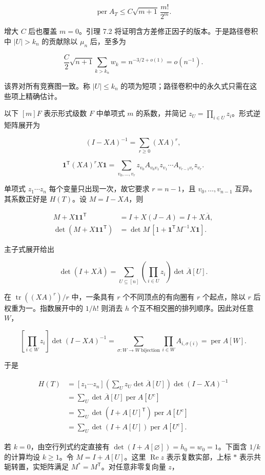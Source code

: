\documentclass[11pt,a4paper]{article}
\begin{document}
\[\operatorname{per}A_T\le C\sqrt{m+1}\,\frac{m!}{2^m}.\]

增大 \(C\) 后也覆盖 \(m=0\)。引理 7.2 将证明含方差修正因子的版本。于是路径卷积中 \(|U|>k_n\) 的贡献除以 \(\mu_n\) 后，至多为

\[\frac C2\sqrt{n+1}\sum_{k>k_n}w_k
=n^{-3/2+o(1)}=o(n^{-1}).\]

该界对所有竞赛图一致。称 \(|U|\le k_n\) 的项为短项；路径卷积中的永久式只需在这些项上精确估计。

以下 \([m]F\) 表示形式级数 \(F\) 中单项式 \(m\) 的系数，并简记 \(z_U=\prod_{i\in U}z_i\)。形式逆矩阵展开为

\[(I-XA)^{-1}=\sum_{r\ge0}(XA)^r,\]

\[\mathbf1^{\mathsf T}(XA)^rX\mathbf1
=\sum_{v_0,\ldots,v_r}
z_{v_0}A_{v_0v_1}z_{v_1}\cdots A_{v_{r-1}v_r}z_{v_r}.\]

单项式 \(z_1\cdots z_n\) 每个变量只出现一次，故它要求 \(r=n-1\)，且 \(v_0,\ldots,v_{n-1}\) 互异。其系数正好是 \(H(T)\)。设 \(M=I-XA\)，则

\[\begin{aligned}
M+X\mathbf1\mathbf1^{\mathsf T}
&=I+X(J-A)=I+X\overline A,\\
\det(M+X\mathbf1\mathbf1^{\mathsf T})
&=\det M\,[1+\mathbf1^{\mathsf T}M^{-1}X\mathbf1].
\end{aligned}\]

主子式展开给出

\[\det(I+X\overline A)=\sum_{U\subseteq[n]}
\left(\prod_{i\in U}z_i\right)\det\overline A[U].\]

在 \(\operatorname{tr}((XA)^r)/r\) 中，一条具有 \(r\) 个不同顶点的有向圈有 \(r\) 个起点，除以 \(r\) 后权重为一。指数展开中的 \(1/h!\) 则消去 \(h\) 个互不相交圈的排列顺序。因此对任意 \(W\)，

\[\left[\prod_{i\in W}z_i\right]\det(I-XA)^{-1}
=\sum_{\sigma:W\to W\ \mathrm{bijection}}
\prod_{i\in W}A_{i,\sigma(i)}=\operatorname{per}A[W].\]

于是

\[\begin{aligned}
H(T)&=[z_1\cdots z_n]
\left(\sum_Uz_U\det\overline A[U]\right)
\det(I-XA)^{-1}\\
&=\sum_U\det\overline A[U]\operatorname{per}A[U^c]\\
&=\sum_U\det(I+A[U]^{\mathsf T})\operatorname{per}A[U^c]\\
&=\sum_U\det(I+A[U])\operatorname{per}A[U^c].
\end{aligned}\]

若 \(k=0\)，由空行列式约定直接有 \(\det(I+A[\varnothing])=h_0=w_0=1\)。下面含 \(1/k\) 的计算均设 \(k\ge1\)。令 \(M=I+A[U]\)。这里 \(\operatorname{Re}z\) 表示复数实部，上标 \(*\) 表示共轭转置，实矩阵满足 \(M^*=M^{\mathsf T}\)。对任意非零复向量 \(z\)，
\end{document}
